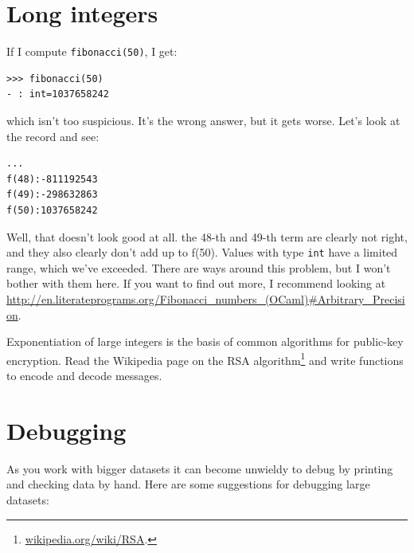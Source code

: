 \documentclass[10pt]{book}
\begin{document}
\section{Long integers}


If I compute {\tt fibonacci(50)}, I get:

\beforeverb
\begin{verbatim}
>>> fibonacci(50)
- : int=1037658242
\end{verbatim}
\afterverb
%
which isn't too suspicious. It's the wrong answer, but it gets worse. Let's look at the record 
and see:

\beforeverb
\begin{verbatim}
...
f(48):-811192543
f(49):-298632863
f(50):1037658242
\end{verbatim}
\afterverb
Well, that doesn't look good at all. the 48-th and 49-th term are clearly not right, and they also clearly don't add up to f(50). Values with type {\tt int} have a limited range, which we've exceeded. There are ways around this problem, but I won't bother with them here. If you want to find out more, I recommend looking at \url{http://en.literateprograms.org/Fibonacci_numbers_(OCaml)#Arbitrary_Precision}.

\begin{ex}


Exponentiation of large integers is the basis of common
algorithms for public-key encryption.  Read the Wikipedia
page on the RSA algorithm\footnote{\url{wikipedia.org/wiki/RSA}.}
and write functions to encode and decode messages.

\end{ex}


\section{Debugging}
As you work with bigger datasets it can become unwieldy to
debug by printing and checking data by hand.  Here are some
suggestions for debugging large datasets:
\end{document}

